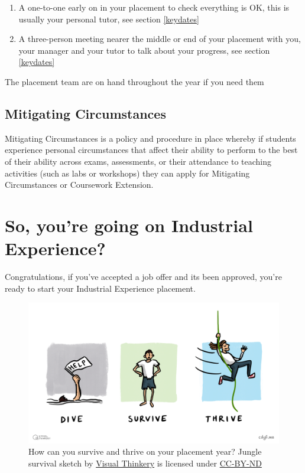 \documentclass[
]{book}
\providecommand{\tightlist}{%
  \setlength{\itemsep}{0pt}\setlength{\parskip}{0pt}}
\begin{document}
\begin{enumerate}
\def\labelenumi{\arabic{enumi}.}
\tightlist
\item
  A one-to-one early on in your placement to check everything is OK, this is usually your personal tutor, see section \ref{keydates}
\item
  A three-person meeting nearer the middle or end of your placement with you, your manager and your tutor to talk about your progress, see section \ref{keydates}
\end{enumerate}

The placement team are on hand throughout the year if you need them

\section{Mitigating Circumstances}\label{mitcircs}

Mitigating Circumstances is a policy and procedure in place whereby if students experience personal circumstances that affect their ability to perform to the best of their ability across exams, assessments, or their attendance to teaching activities (such as labs or workshops) they can apply for Mitigating Circumstances or Coursework Extension. \citep{mitcircs}

\chapter{So, you're going on Industrial Experience?}\label{starting}

Congratulations, if you've accepted a job offer and its been approved, you're ready to start your Industrial Experience placement.

\begin{figure}

{\centering \includegraphics[width=1\linewidth]{images/DiveThriveSurvive} 

}

\caption{How can you survive and thrive on your placement year? Jungle survival sketch by \href{https://visualthinkery.com}{Visual Thinkery} is licensed under \href{https://creativecommons.org/licenses/by-nd/4.0/}{CC-BY-ND}}\label{fig:survival-fig}
\end{figure}
\end{document}
